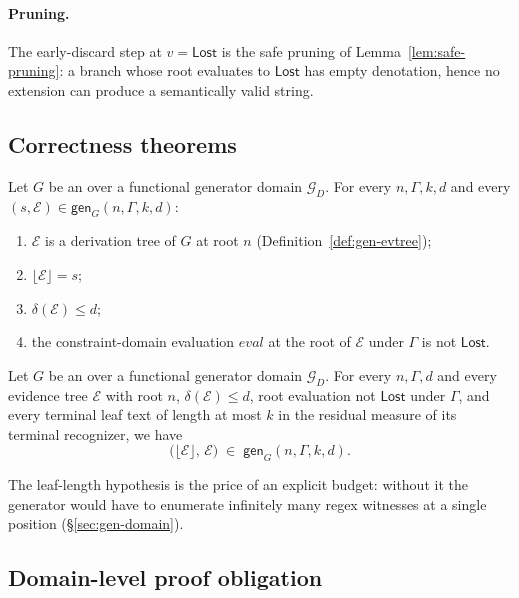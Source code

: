 \paragraph{Pruning.}
The early-discard step at \(v = \mathsf{Lost}\) is the safe pruning of
Lemma~\ref{lem:safe-pruning}: a branch whose root evaluates to \(\mathsf{Lost}\)
has empty denotation, hence no extension can produce a semantically valid
string.

\subsection{Correctness theorems}
\label{sec:gen-correctness}

\begin{theorem}
\label{thm:gen-sound}
Let \(G\) be an \spg{} over a functional generator domain \(\mathcal{G}_D\).
For every \(n,\Gamma,k,d\) and every
\((s, \mathcal{E}) \in \mathsf{gen}_G(n, \Gamma, k, d)\):
\begin{enumerate}[nosep]
  \item \(\mathcal{E}\) is a derivation tree of \(G\) at root \(n\)
    (Definition~\ref{def:gen-evtree});
  \item \(\lfloor \mathcal{E} \rfloor = s\);
  \item \(\delta(\mathcal{E}) \le d\);
  \item the constraint-domain evaluation \(\mathit{eval}\) at the root of
    \(\mathcal{E}\) under \(\Gamma\) is not \(\mathsf{Lost}\).
\end{enumerate}
\end{theorem}

\begin{theorem}
\label{thm:gen-complete}
Let \(G\) be an \spg{} over a functional generator domain \(\mathcal{G}_D\).
For every \(n,\Gamma,d\) and every evidence tree \(\mathcal{E}\) with root
\(n\), \(\delta(\mathcal{E}) \le d\), root evaluation not \(\mathsf{Lost}\)
under \(\Gamma\), and every terminal leaf text of length at most \(k\) in
the residual measure of its terminal recognizer, we have
\[
  \bigl(\lfloor \mathcal{E} \rfloor,\, \mathcal{E}\bigr)
  \;\in\;
  \mathsf{gen}_G(n, \Gamma, k, d).
\]
\end{theorem}

The leaf-length hypothesis is the price of an explicit budget: without it
the generator would have to enumerate infinitely many regex witnesses at a
single position (\S\ref{sec:gen-domain}).

\subsection{Domain-level proof obligation}
\label{sec:gen-obligations}

